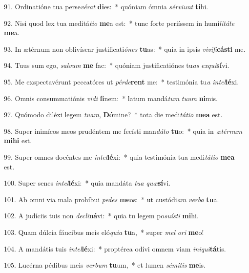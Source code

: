 91. Ordinatióne tua perse\textit{vé}\textit{rat} \textbf{di}es:~*  quóniam ómnia \textit{sér}\textit{vi}\textit{unt} \textbf{ti}bi.\

92. Nisi quod lex tua meditá\textit{ti}\textit{o} \textbf{me}a est:~*  tunc forte periíssem in humi\textit{li}\textit{tá}\textit{te} \textbf{me}a.\

93. In ætérnum non oblivíscar justificati\textit{ó}\textit{nes} \textbf{tu}as:~*  quia in ipsis \textit{vi}\textit{vi}\textit{fi}\textbf{cás}\textbf{ti} me.\

94. Tuus sum ego, \textit{sal}\textit{vum} \textbf{me} fac:~*  quóniam justificatiónes tu\textit{as} \textit{ex}\textit{qui}\textbf{sí}vi.\

95. Me exspectavérunt peccatóres ut \textit{pér}\textit{de}\textbf{rent} me:~*  testimónia tu\textit{a} \textit{in}\textit{tel}\textbf{lé}xi.\

96. Omnis consummatiónis \textit{vi}\textit{di} \textbf{fi}nem:~*  latum mandá\textit{tum} \textit{tu}\textit{um} \textbf{ni}mis.\

97. Quómodo diléxi legem \textit{tu}\textit{am}, \textbf{Dó}mine?~*  tota die medi\textit{tá}\textit{ti}\textit{o} \textbf{me}\textbf{a} est.\

98. Super inimícos meos prudéntem me fecísti man\textit{dá}\textit{to} \textbf{tu}o:~*  quia in \textit{æ}\textit{tér}\textit{num} \textbf{mi}\textbf{hi} est.\

99. Super omnes docéntes me \textit{in}\textit{tel}\textbf{lé}xi:~*  quia testimónia tua medi\textit{tá}\textit{ti}\textit{o} \textbf{me}\textbf{a} est.\

100. Super senes \textit{in}\textit{tel}\textbf{lé}xi:~*  quia mandáta \textit{tu}\textit{a} \textit{quæ}\textbf{sí}vi.\

101. Ab omni via mala prohíbui \textit{pe}\textit{des} \textbf{me}os:~*  ut custódi\textit{am} \textit{ver}\textit{ba} \textbf{tu}a.\

102. A judíciis tuis non \textit{de}\textit{cli}\textbf{ná}vi:~*  quia tu legem po\textit{su}\textit{ís}\textit{ti} \textbf{mi}hi.\

103. Quam dúlcia fáucibus meis eló\textit{qui}\textit{a} \textbf{tu}a,~*  super \textit{mel} \textit{o}\textit{ri} \textbf{me}o!\

104. A mandátis tuis \textit{in}\textit{tel}\textbf{lé}xi:~*  proptérea odívi omnem viam \textit{in}\textit{i}\textit{qui}\textbf{tá}tis.\

105. Lucérna pédibus meis \textit{ver}\textit{bum} \textbf{tu}um,~*  et lumen \textit{sé}\textit{mi}\textit{tis} \textbf{me}is.\

